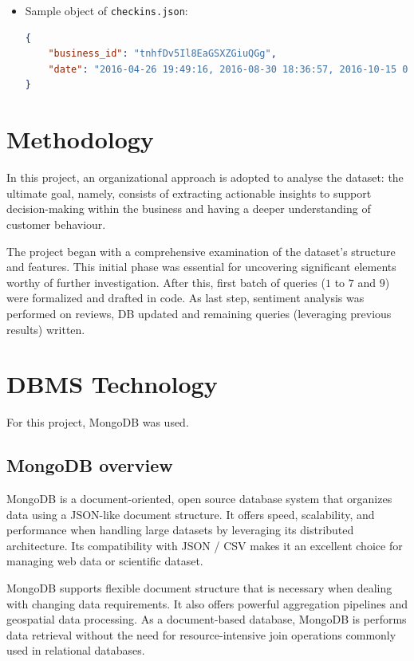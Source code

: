 \documentclass{Configuration_Files/PoliMi3i_thesis}
\begin{document}
\begin{itemize}
\bigskip

\item Sample object of \texttt{checkins.json}:
\bigskip
\begin{lstlisting}[language=json]
{
    "business_id": "tnhfDv5Il8EaGSXZGiuQGg",
    "date": "2016-04-26 19:49:16, 2016-08-30 18:36:57, 2016-10-15 02:45:18, 2016-11-18 01:54:50, 2017-04-20 18:39:06, 2017-05-03 17:58:02"
}
\end{lstlisting}

\end{itemize}

\section{Methodology}
In this project, an organizational approach is adopted to analyse the dataset: the ultimate goal, namely, consists of extracting actionable insights to support decision-making within the business and having a deeper understanding of customer behaviour. 

\bigskip

The project began with a comprehensive examination of the dataset’s structure and features. This initial phase was essential for uncovering significant elements worthy of further investigation. After this, first batch of queries ($1$ to $7$ and $9$) were formalized and drafted in code. As last step, sentiment analysis was performed on reviews, DB updated and remaining queries (leveraging previous results) written.  

\section{DBMS Technology}
For this project, MongoDB was used.

\subsection{MongoDB overview}
MongoDB is a document-oriented, open source database system that organizes data using a JSON-like document structure. It offers speed, scalability, and performance when handling large datasets by leveraging its distributed architecture. Its compatibility with JSON / CSV makes it an excellent choice for managing web data or scientific dataset.

MongoDB supports flexible document structure that is necessary when dealing with changing data requirements. It also offers powerful aggregation pipelines and geospatial data processing. As a document-based database, MongoDB is performs data retrieval without the need for resource-intensive join operations commonly used in relational databases.
\end{document}
